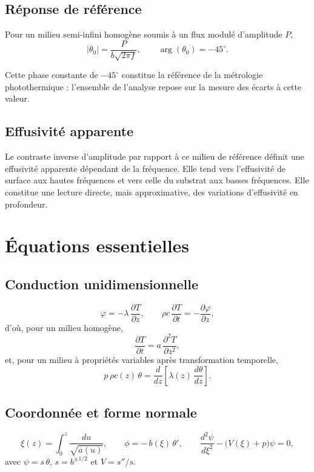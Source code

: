 \documentclass[11pt,a4paper]{article}
\begin{document}
\subsection{Réponse de référence}

Pour un milieu semi-infini homogène soumis à un flux modulé d'amplitude $P$,
\[ |\theta_{0}| = \frac{P}{b\sqrt{2\pi f}} , \qquad \arg(\theta_{0}) = -45^{\circ} . \]

Cette phase constante de $-45^{\circ}$ constitue la référence de la métrologie photothermique :
l'ensemble de l'analyse repose sur la mesure des écarts à cette valeur.

\subsection{Effusivité apparente}

Le contraste inverse d'amplitude par rapport à ce milieu de référence définit une effusivité apparente
dépendant de la fréquence. Elle tend vers l'effusivité de surface aux hautes fréquences et vers celle
du substrat aux basses fréquences. Elle constitue une lecture directe, mais approximative, des
variations d'effusivité en profondeur.

\section{Équations essentielles}

\subsection{Conduction unidimensionnelle}

\[ \varphi = -\lambda\,\frac{\partial T}{\partial z} ,
\qquad
\rho c\,\frac{\partial T}{\partial t} = -\frac{\partial\varphi}{\partial z} , \]
d'où, pour un milieu homogène,
\[ \frac{\partial T}{\partial t} = a\,\frac{\partial^{2}T}{\partial z^{2}} , \]
et, pour un milieu à propriétés variables après transformation temporelle,
\[ p\,\rho c(z)\,\theta = \frac{d}{dz}\!\left[\lambda(z)\,\frac{d\theta}{dz}\right] . \]

\subsection{Coordonnée et forme normale}

\[ \xi(z) = \int_{0}^{z}\frac{du}{\sqrt{a(u)}} ,
\qquad
\phi = -\,b(\xi)\,\theta' ,
\qquad
\frac{d^{2}\psi}{d\xi^{2}} - \bigl(V(\xi)+p\bigr)\psi = 0 , \]
avec $\psi = s\,\theta$, $s = b^{\pm 1/2}$ et $V = s''/s$.
\end{document}
